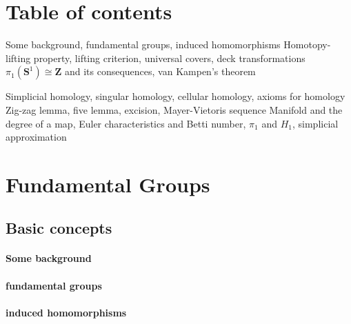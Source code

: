 \documentclass[11pt]{article}
\theoremstyle{definition}
\theoremstyle{plain}
\newcommand{\Z}{\mathbf{Z}}
\newcommand{\1}{\mathbf{1}}
\newcommand{\s}{\mathbf{S}}
\newcommand{\forceindent}{\leavevmode{\parindent=1.5em\indent}}
\begin{document}
\section*{Table of contents}

\forceindent\forceindent\forceindent Some background, fundamental groups, induced homomorphisms
\forceindent\forceindent\forceindent Homotopy-lifting property, lifting criterion, universal covers, deck transformations
\forceindent\forceindent\forceindent $\pi_1(\s^1)\cong\Z$ and its consequences, van Kampen's theorem

\forceindent\forceindent\forceindent Simplicial homology, singular homology, cellular homology, axioms for homology
\forceindent\forceindent\forceindent Zig-zag lemma, five lemma, excision, Mayer-Vietoris sequence
\forceindent\forceindent\forceindent Manifold and the degree of a map, Euler characteristics and Betti number, $\pi_1$ and $H_1$,\newline
\forceindent\forceindent\forceindent simplicial approximation


\newpage
\section{Fundamental Groups}

\subsection{Basic concepts}

\paragraph{Some background}

\paragraph{fundamental groups}

\paragraph{induced homomorphisms}
\end{document}
